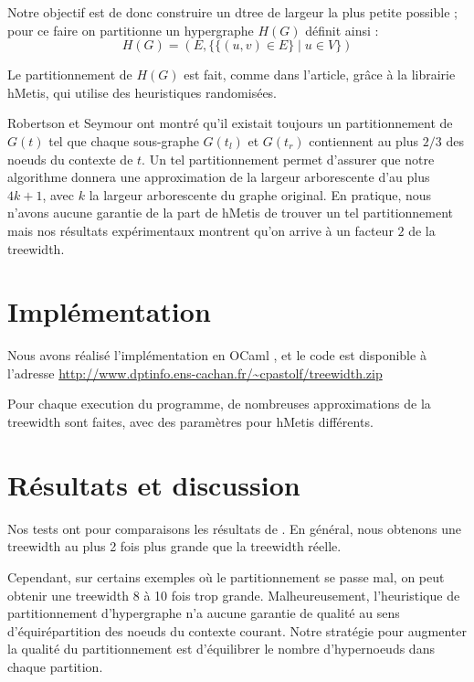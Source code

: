 \documentclass{article}
\begin{document}
Notre objectif est de donc construire un dtree de largeur la plus
petite possible ; pour ce faire on partitionne un hypergraphe $H(G)$
définit ainsi :
$$ H(G) = (E,\{ \{ (u,v) \in E \} \mid u \in V \}) $$

Le partitionnement de $H(G)$ est fait, comme dans l'article, grâce à
la librairie hMetis, qui utilise des heuristiques randomisées.

Robertson et Seymour \cite{robert} ont montré qu'il existait toujours
un partitionnement de $G(t)$ tel que chaque sous-graphe $G(t_l)$ et
$G(t_r)$ contiennent au plus $2/3$ des noeuds du contexte de $t$.  Un
tel partitionnement permet d'assurer que notre algorithme donnera une
approximation de la largeur arborescente d'au plus $4k+1$, avec $k$ la
largeur arborescente du graphe original.  En pratique, nous n'avons
aucune garantie de la part de hMetis de trouver un tel partitionnement
mais nos résultats expérimentaux montrent qu'on arrive à un facteur
$2$ de la treewidth.



\section{Implémentation}
Nous avons réalisé l'implémentation en OCaml \cite{ocaml}, et le code
est disponible à l'adresse
\url{http://www.dptinfo.ens-cachan.fr/~cpastolf/treewidth.zip}

Pour chaque execution du programme, de nombreuses approximations de la
treewidth sont faites, avec des paramètres pour hMetis différents.


\section{Résultats et discussion}
Nos tests ont pour comparaisons les résultats de \cite{tree}. En
général, nous obtenons une treewidth au plus 2 fois plus grande que la
treewidth réelle.

Cependant, sur certains exemples où le partitionnement se passe mal,
on peut obtenir une treewidth 8 à 10 fois trop
grande. Malheureusement, l'heuristique de partitionnement
d'hypergraphe n'a aucune garantie de qualité au sens
d'équirépartition des noeuds du contexte courant. 
Notre stratégie pour augmenter la qualité du partitionnement est
d'équilibrer le nombre d'hypernoeuds dans chaque partition.



\end{document}
